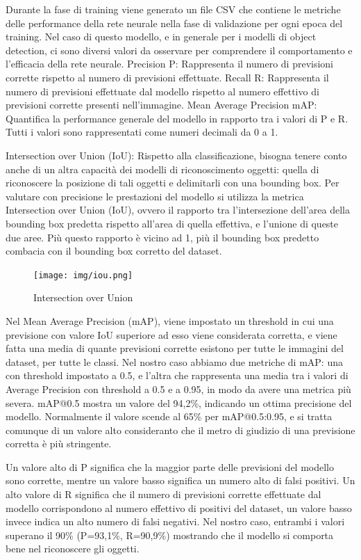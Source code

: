 \documentclass{article}
\begin{document}
  Durante la fase di training viene generato un file CSV che contiene le metriche delle performance della rete neurale nella fase di validazione per ogni epoca del training.
  Nel caso di questo modello, e in generale per i modelli di object detection, ci sono diversi valori da osservare per comprendere il comportamento e l'efficacia della rete neurale.
  Precision P: Rappresenta il numero di previsioni corrette rispetto al numero di previsioni effettuate.
  Recall R: Rappresenta il numero di previsioni effettuate dal modello rispetto al numero effettivo di previsioni corrette presenti nell'immagine.
  Mean Average Precision mAP: Quantifica la performance generale del modello in rapporto tra i valori di P e R.
  Tutti i valori sono rappresentati come numeri decimali da 0 a 1.

  Intersection over Union (IoU): Rispetto alla classificazione, bisogna tenere conto anche di un altra capacità dei modelli di riconoscimento oggetti: quella di riconoscere la posizione di tali oggetti e delimitarli con una bounding box.
  Per valutare con precisione le prestazioni del modello si utilizza la metrica Intersection over Union (IoU), ovvero il rapporto tra l'intersezione dell'area della bounding box predetta rispetto all'area di quella effettiva, e l'unione di queste due aree.
  Più questo rapporto è vicino ad 1, più il bounding box predetto combacia con il bounding box corretto del dataset.
  

  \begin{figure}[h!]
    \centering
    \texttt{[image: img/iou.png]}
    \caption{Intersection over Union}
  \end{figure}
  
  \newpage

  Nel Mean Average Precision (mAP), viene impostato un threshold in cui una previsione con valore IoU superiore ad esso viene considerata corretta, e viene fatta una media di quante previsioni corrette esistono per tutte le immagini del dataset, per tutte le classi.
  Nel nostro caso abbiamo due metriche di mAP: una con threshold impostato a 0.5, e l'altra che rappresenta una media tra i valori di Average Precision con threshold a 0.5 e a 0.95, in modo da avere una metrica più severa.
  mAP@0.5 mostra un valore del 94,2\%, indicando un ottima precisione del modello. Normalmente il valore scende al 65\% per mAP@0.5:0.95, e si tratta comunque di un valore alto consideranto che il metro di giudizio di una previsione corretta è più stringente.

  Un valore alto di P significa che la maggior parte delle previsioni del modello sono corrette, mentre un valore basso significa un numero alto di falsi positivi.
  Un alto valore di R significa che il numero di previsioni corrette effettuate dal modello corrispondono al numero effettivo di positivi del dataset, un valore basso invece indica un alto numero di falsi negativi.
   Nel nostro caso, entrambi i valori superano il 90\% (P=93,1\%, R=90,9\%) mostrando che il modello si comporta bene nel riconoscere gli oggetti.
\end{document}
